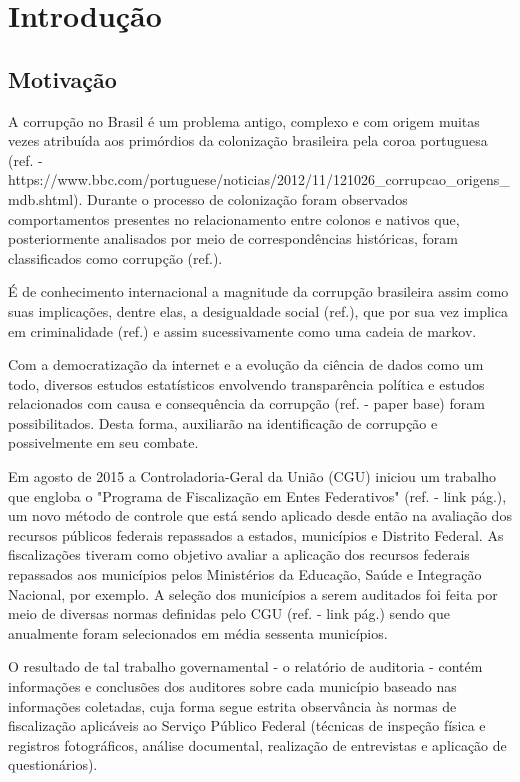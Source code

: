 \chapter{Introdução}
\label{cap:introducao}

\section{Motivação}
\label{sec:motivacao}

A corrupção no Brasil é um problema antigo, complexo e com origem muitas vezes atribuída aos primórdios da colonização brasileira pela coroa portuguesa (ref. - https://www.bbc.com/portuguese/noticias/2012/11/121026_corrupcao_origens_mdb.shtml). Durante o processo de colonização foram observados comportamentos presentes no relacionamento entre colonos e nativos que, posteriormente analisados por meio de correspondências históricas, foram classificados como corrupção (ref.).

É de conhecimento internacional a magnitude da corrupção brasileira assim como suas implicações, dentre elas, a desigualdade social (ref.), que por sua vez implica em criminalidade (ref.) e assim sucessivamente como uma cadeia de markov.

Com a democratização da internet e a evolução da ciência de dados como um todo, diversos estudos estatísticos envolvendo transparência política e estudos relacionados com causa e consequência da corrupção (ref. - paper base) foram possibilitados. Desta forma, auxiliarão na identificação de corrupção e possivelmente em seu combate.

Em agosto de 2015 a Controladoria-Geral da União (CGU) iniciou um trabalho que engloba o "Programa de Fiscalização em Entes Federativos" (ref. - link pág.), um novo método de controle que está sendo aplicado desde então na avaliação dos recursos públicos federais repassados a estados, municípios e Distrito Federal. As fiscalizações tiveram como objetivo avaliar a aplicação dos recursos federais repassados aos municípios pelos Ministérios da Educação, Saúde e Integração Nacional, por exemplo. A seleção dos municípios a serem auditados foi feita por meio de diversas normas definidas pelo CGU (ref. - link pág.) sendo que anualmente foram selecionados em média sessenta municípios.

O resultado de tal trabalho governamental - o relatório de auditoria - contém informações e conclusões dos auditores sobre cada município baseado nas informações coletadas, cuja forma segue estrita observância às normas de fiscalização aplicáveis ao Serviço Público Federal (técnicas de inspeção física e registros fotográficos, análise documental, realização de entrevistas e aplicação de questionários).

